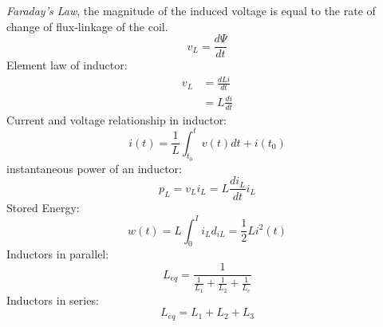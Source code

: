 \begin{enumerate}
\textit{Faraday's Law}, the magnitude of the induced voltage is equal to the rate of change of flux-linkage of the coil.
\[v_L=\frac{d\Psi}{dt}\]
Element law of inductor:
\begin{align*}
v_L &= \frac{dLi}{dt}\\
    &= L\frac{di}{dt}
\end{align*}
Current and voltage relationship in inductor:
\[i(t)=\frac{1}{L}\int^t_{t_0}v(t)dt+i(t_0)\]
instantaneous power of an inductor:
\[p_L =v_Li_L =L\frac{di_L}{dt}i_L\]
Stored Energy:
\[w(t)=L\int^{I}_{0}i_Ld_{iL} = \frac{1}{2}Li^2(t)\]
Inductors in parallel:
\[L_{eq}=\frac{1}{\frac{1}{L_1}+\frac{1}{L_2}+\frac{1}{L_e}}\]
Inductors in series:
\[L_{eq}=L_1+L_2+L_3\]
\end{enumerate}